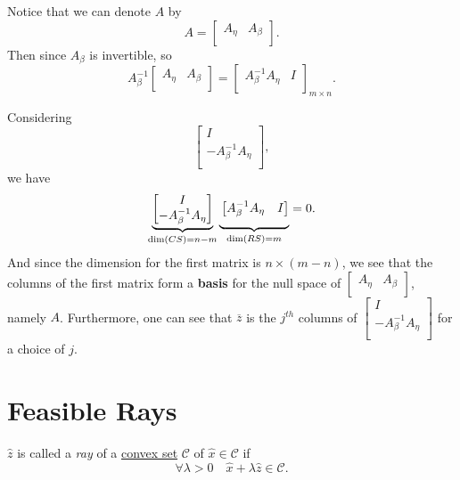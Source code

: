 \begin{note}
	Notice that we can denote \(A\) by
	\[
		A = \begin{bmatrix}
			A_{\eta} & A_{\beta} \\
		\end{bmatrix}.
	\]
	Then since \(A_{\beta}\) is invertible, so
	\[
		A^{-1}_{\beta}\begin{bmatrix}
			A_{\eta} & A_{\beta} \\
		\end{bmatrix} = \begin{bmatrix}
			A^{-1}_{\beta}A_{\eta} & I \\
		\end{bmatrix}_{m\times n}.
	\]

	Considering
	\[
		\begin{bmatrix}
			I                       \\
			-A^{-1}_{\beta}A_{\eta} \\
		\end{bmatrix},
	\]
	we have
	\[
		\underbrace{
			\begin{bmatrix}
				I                       \\
				-A^{-1}_{\beta}A_{\eta} \\
			\end{bmatrix}}_{\dim(CS) = n-m}\underbrace{\vphantom{\begin{bmatrix}
					\\ \\
				\end{bmatrix}}\begin{bmatrix}
				A^{-1}_{\beta}A_{\eta} & I \\
			\end{bmatrix}}_{\dim(RS)=m} = 0.
	\]
	And since the dimension for the first matrix is \(n\times (m-n)\), we see that the columns of the first matrix form a \textbf{basis} for the null space of \(\begin{bmatrix}
		A_{\eta} & A_{\beta} \\
	\end{bmatrix}\), namely \(A\). Furthermore, one can see that \(\overline{z}\) is the \(j^{th}\) columns of \(\begin{bmatrix}
		I                       \\
		-A^{-1}_{\beta}A_{\eta} \\
	\end{bmatrix}\) for a choice of \(j\).
\end{note}

\section{Feasible Rays}
\begin{definition}[Ray]\label{def:ray}
	\(\hat{z}\) is called a \emph{ray} of a \hyperref[def:convex-set]{convex set} \(\mathcal{C}\) of \(\hat{x}\in \mathcal{C}\) if
	\[
		\forall \lambda>0\quad \hat{x} + \lambda \hat{z} \in \mathcal{C}.
	\]
	\begin{center}
	\end{center}
\end{definition}

